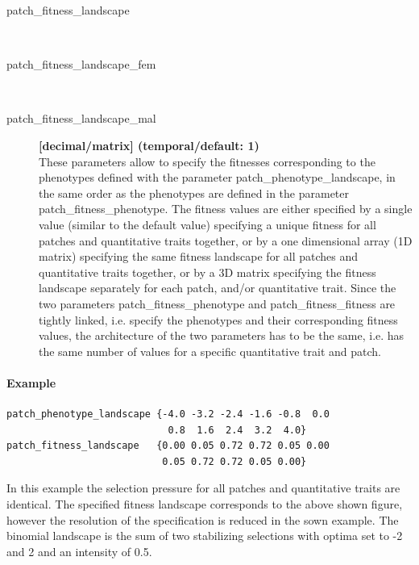 \documentclass[letterpaper,12pt,oneside]{book}
\begin{document}
\begin{description}
\item[patch\_fitness\_landscape]\hspace*{\fill}\\
\vspace{-9mm}
\item[patch\_fitness\_landscape\_fem]\hspace*{\fill}\\
\vspace{-9mm}
\item[patch\_fitness\_landscape\_mal]\textbf{[decimal/matrix] (temporal/default: 1)}\\
These parameters allow to specify the fitnesses corresponding to the phenotypes defined with the parameter \textsf{patch\_phenotype\_landscape}, in the same order as the phenotypes are defined in the parameter \textsf{patch\_fitness\_phenotype}. The fitness values are either specified by a single value (similar to the default value) specifying a unique fitness for all patches and quantitative traits together, or by a one dimensional array (1D matrix) specifying the same fitness landscape for all patches and quantitative traits together, or by a 3D matrix specifying the fitness landscape separately for each patch, and/or quantitative trait. Since the two parameters \textsf{patch\_fitness\_phenotype} and \textsf{patch\_fitness\_fitness} are tightly linked, i.e. specify the phenotypes and their corresponding fitness values, the architecture of the two parameters has to be the same, i.e. has the same number of values for a specific quantitative trait and patch.  
\end{description}

\paragraph{Example}\hspace*{\fill}
\begin{lstlisting}[frame=single]
patch_phenotype_landscape {-4.0 -3.2 -2.4 -1.6 -0.8  0.0  
                            0.8  1.6  2.4  3.2  4.0}
patch_fitness_landscape   {0.00 0.05 0.72 0.72 0.05 0.00 
                           0.05 0.72 0.72 0.05 0.00}	
\end{lstlisting}
In this example the selection pressure for all patches and quantitative traits are identical. The specified fitness landscape corresponds to the above shown figure, however the resolution of the specification is reduced in the sown example. The binomial landscape is the sum of two stabilizing selections with optima set to -2 and 2 and an intensity of 0.5. 
\end{document}
